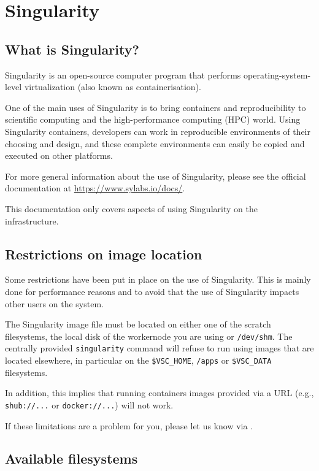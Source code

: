 \chapter{Singularity}
\label{ch:singularity}

\section{What is Singularity?}

Singularity is an open-source computer program that performs operating-system-level virtualization (also known as containerisation).

One of the main uses of Singularity is to bring containers and reproducibility to
scientific computing and the high-performance computing (HPC) world.
Using Singularity containers, developers can work in reproducible environments of their choosing and design,
and these complete environments can easily be copied and executed on other platforms.

For more general information about the use of Singularity, please see the official documentation at \url{https://www.sylabs.io/docs/}.

This documentation only covers aspects of using Singularity on the \hpcInfra infrastructure.

\section{Restrictions on image location}

Some restrictions have been put in place on the use of Singularity. This is mainly done
for performance reasons and to avoid that the use of Singularity impacts other users on the system.

The Singularity image file must be located on either one of the scratch filesystems,
the local disk of the workernode you are using or \lstinline|/dev/shm|. The centrally provided \lstinline|singularity|
command will refuse to run using images that are located elsewhere, in particular on the \lstinline|$VSC_HOME|,
\lstinline|/apps| or \lstinline|$VSC_DATA| filesystems.

In addition, this implies that running containers images provided via a URL
(e.g., \lstinline|shub://...| or \lstinline|docker://...|) will not work.

If these limitations are a problem for you, please let us know via \hpcinfo.

\section{Available filesystems}

